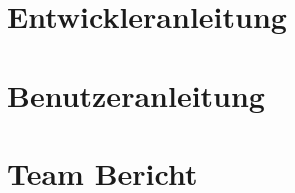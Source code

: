 














\tableofcontents




\texttt{}
\begin{lstlisting}[language=bash, keywords={}]
\end{lstlisting}
\begin{lstlisting}[language={[x86masm]Assembler}]
\end{lstlisting}

\chapter{Entwickleranleitung}
\label{dev}

\chapter{Benutzeranleitung}
\label{user}

\chapter{Team Bericht}
\label{team}




